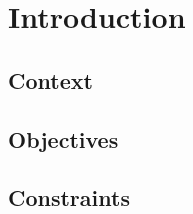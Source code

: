 \chapter{Introduction}
\label{sec:introduction}
\thispagestyle{fancy}

\lipsum[4]

\section{Context}
\lipsum[2]

\section{Objectives}
\lipsum[3]

\section{Constraints}
\lipsum[1]

